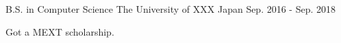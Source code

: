 \begin{cventries} %
  \cventry
    {B.S. in Computer Science} %
    {The University of XXX} %
    {Japan} %
    {Sep. 2016 - Sep. 2018} %
    {
      \begin{cvitems} %
        \item {Got a MEXT scholarship.}
      \end{cvitems}
    }

\end{cventries}

